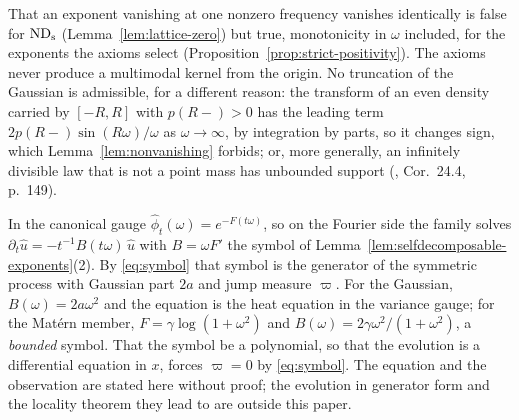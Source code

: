 That an exponent vanishing at one nonzero frequency vanishes identically is false for
$\mathrm{ND}_{\mathrm{s}}$ (Lemma~\ref{lem:lattice-zero}) but true, monotonicity in $\omega$ included, for the
exponents the axioms select (Proposition~\ref{prop:strict-positivity}). The axioms never
produce a multimodal kernel from the origin. No truncation of the Gaussian is admissible,
for a different reason: the transform of an even density carried by $[-R,R]$ with
$p(R-) > 0$ has the leading term $2p(R-)\sin(R\omega)/\omega$ as $\omega \to \infty$, by
integration by parts, so it changes sign, which Lemma~\ref{lem:nonvanishing} forbids; or,
more generally, an infinitely divisible law that is not a point mass has unbounded support
(, Cor.~24.4, p.~149).

\begin{remark}\label{rem:scale-evolution-preview}
In the canonical gauge $\hat\phi_t(\omega) = e^{-F(t\omega)}$, so on the Fourier side the
family solves $\partial_t\hat u = -t^{-1}B(t\omega)\,\hat u$ with $B = \omega F'$ the symbol of
Lemma~\ref{lem:selfdecomposable-exponents}(2). By \ref{eq:symbol} that symbol is the
generator of the symmetric \Levy{} process with Gaussian part $2a$ and jump measure $\varpi$.
For the Gaussian, $B(\omega) = 2a\omega^2$ and the equation is the heat equation in the
variance gauge; for the Mat\'ern member, $F = \gamma\log(1+\omega^2)$ and
$B(\omega) = 2\gamma\omega^2/(1+\omega^2)$, a \emph{bounded} symbol. That the symbol be a
polynomial, so that the evolution is a differential equation in $x$, forces $\varpi = 0$ by
\ref{eq:symbol}. The equation and the observation are stated here without proof; the
evolution in generator form and the locality theorem they lead to are outside this paper.
\end{remark}

